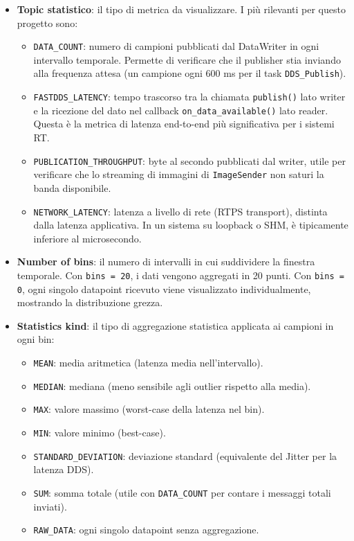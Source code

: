 \begin{itemize}
	\item \textbf{Topic statistico}: il tipo di metrica da visualizzare. I più rilevanti per questo progetto sono:
	\begin{itemize}
		\item \texttt{DATA\_COUNT}: numero di campioni pubblicati dal DataWriter in ogni intervallo temporale. Permette di verificare che il publisher stia inviando alla frequenza attesa (un campione ogni 600 ms per il task \texttt{DDS\_Publish}).
		\item \texttt{FASTDDS\_LATENCY}: tempo trascorso tra la chiamata \texttt{publish()} lato writer e la ricezione del dato nel callback \texttt{on\_data\_available()} lato reader. Questa è la metrica di latenza end-to-end più significativa per i sistemi RT.
		\item \texttt{PUBLICATION\_THROUGHPUT}: byte al secondo pubblicati dal writer, utile per verificare che lo streaming di immagini di \texttt{ImageSender} non saturi la banda disponibile.
		\item \texttt{NETWORK\_LATENCY}: latenza a livello di rete (RTPS transport), distinta dalla latenza applicativa. In un sistema su loopback o SHM, è tipicamente inferiore al microsecondo.
	\end{itemize}
	
	\item \textbf{Number of bins}: il numero di intervalli in cui suddividere la finestra temporale. Con \texttt{bins = 20}, i dati vengono aggregati in 20 punti. Con \texttt{bins = 0}, ogni singolo datapoint ricevuto viene visualizzato individualmente, mostrando la distribuzione grezza.
	
	\item \textbf{Statistics kind}: il tipo di aggregazione statistica applicata ai campioni in ogni bin:
	\begin{itemize}
		\item \texttt{MEAN}: media aritmetica (latenza media nell'intervallo).
		\item \texttt{MEDIAN}: mediana (meno sensibile agli outlier rispetto alla media).
		\item \texttt{MAX}: valore massimo (worst-case della latenza nel bin).
		\item \texttt{MIN}: valore minimo (best-case).
		\item \texttt{STANDARD\_DEVIATION}: deviazione standard (equivalente del Jitter per la latenza DDS).
		\item \texttt{SUM}: somma totale (utile con \texttt{DATA\_COUNT} per contare i messaggi totali inviati).
		\item \texttt{RAW\_DATA}: ogni singolo datapoint senza aggregazione.
	\end{itemize}
\end{itemize}

